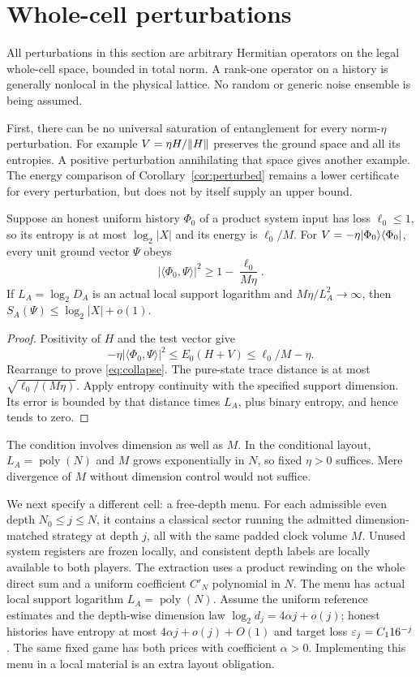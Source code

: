 \section{Whole-cell perturbations}\label{sec:noise}
All perturbations in this section are arbitrary Hermitian operators on
the legal whole-cell space, bounded in total norm. A rank-one operator
on a history is generally nonlocal in the physical lattice. No random
or generic noise ensemble is being assumed.

First, there can be no universal saturation of entanglement for every
norm-$\eta$ perturbation. For example $V=\eta H/\lVert H\rVert$ preserves
the ground space and all its entropies. A positive perturbation
annihilating that space gives another example. The energy comparison
of Corollary~\ref{cor:perturbed} remains a lower certificate for every
perturbation, but does not by itself supply an upper bound.

\begin{proposition}\label{prop:collapse}
Suppose an honest uniform history $\Phi_0$ of a product system input
has loss $\ell_0\leq1$, so its entropy is at most $\log_2|X|$ and
its energy is $\ell_0/M$. For $V=-\eta\lvert\Phi_0\rangle\langle\Phi_0\rvert$,
every unit ground vector $\Psi$ obeys
\begin{equation}\label{eq:collapse}
 |\langle\Phi_0,\Psi\rangle|^2\geq1-\frac{\ell_0}{M\eta}.
\end{equation}
If $L_A=\log_2D_A$ is an actual local support logarithm and
$M\eta/L_A^2\to\infty$, then
$S_A(\Psi)\leq\log_2|X|+o(1)$.
\end{proposition}
\begin{proof}
Positivity of $H$ and the test vector give
\[
 -\eta|\langle\Phi_0,\Psi\rangle|^2
 \leq E_0(H+V)\leq\ell_0/M-\eta.
\]
Rearrange to prove \eqref{eq:collapse}. The pure-state trace distance
is at most $\sqrt{\ell_0/(M\eta)}$. Apply entropy continuity with
the specified support dimension. Its error is bounded by that distance
times $L_A$, plus binary entropy, and hence tends to zero.
\end{proof}

The condition involves dimension as well as $M$. In the conditional
layout, $L_A=\operatorname{poly}(N)$ and $M$ grows exponentially
in $N$, so fixed $\eta>0$ suffices. Mere divergence of $M$ without
dimension control would not suffice.

We next specify a different cell: a free-depth menu. For each
admissible even depth $N_0\leq j\leq N$, it contains a classical
sector running the admitted dimension-matched strategy at depth $j$,
all with the same padded clock volume $M$. Unused system registers
are frozen locally, and consistent depth labels are locally available
to both players. The extraction uses a product rewinding on the whole
direct sum and a uniform coefficient $C'_N$ polynomial in $N$.
The menu has actual local support logarithm $L_A=\operatorname{poly}(N)$.
Assume the uniform reference estimates and the depth-wise dimension
law $\log_2d_j=4\alpha j+o(j)$; honest histories have entropy at most
$4\alpha j+o(j)+O(1)$ and target loss
$\varepsilon_j=C_1 16^{-j}$. The same fixed game has both prices with
coefficient $\alpha>0$. Implementing this menu in a local material
is an extra layout obligation.

